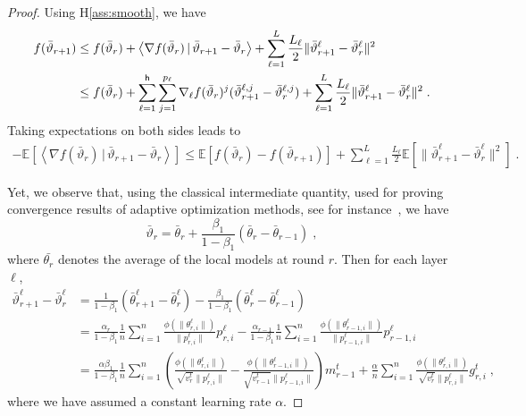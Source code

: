 \documentclass[11pt]{article}
\newcommand{\eqsp}{\;}
\newcommand{\beq}{\begin{equation}}
\newcommand{\eeq}{\end{equation}}
\def\EE{\mathbb{E}}
\newcommand{\pscal}[2]{\left\langle#1\,|\,#2 \right\rangle}
\def\tot{\mathsf{h}}
\begin{document}
\begin{proof}
Using H\ref{ass:smooth}, we have
\begin{align}\notag
f(\bar{\vartheta}_{r+1}) &  \leq f(\bar{\vartheta}_r) + \pscal{\nabla f(\bar{\vartheta}_r)}{\bar{\vartheta}_{r+1} - \bar{\vartheta}_r} + \sum_{\ell =1}^L \frac{L_\ell}{2} \| \bar{\vartheta}^\ell_{r+1} - \bar{\vartheta}^\ell_r \|^2\\\notag
&  \leq f(\bar{\vartheta}_r) + \sum_{\ell=1}^\tot \sum_{j=1}^{p_\ell} \nabla_{\ell} f(\bar{\vartheta}_r)^j (\bar{\vartheta}^{\ell,j}_{r+1} - \bar{\vartheta}^{\ell,j}_r) + \sum_{\ell =1}^L \frac{L_\ell}{2} \| \bar{\vartheta}^\ell_{r+1} - \bar{\vartheta}^\ell_r \|^2  \eqsp.
\end{align}
Taking expectations on both sides leads to
\begin{align}\label{eq:main}
- \EE[  \pscal{\nabla f(\bar{\vartheta}_r)}{\bar{\vartheta}_{r+1} - \bar{\vartheta}_r}]  \leq  \EE[ f(\bar{\vartheta}_r) - f(\bar{\vartheta}_{r+1})] + \sum_{\ell =1}^L \frac{L_\ell}{2} \EE[  \| \bar{\vartheta}^\ell_{r+1} - \bar{\vartheta}^\ell_r \|^2] \eqsp.
\end{align}

Yet, we observe that, using the classical intermediate quantity, used for proving convergence results of adaptive optimization methods, see for instance~\citet{reddi2019convergence}, we have
\beq\label{eq:defseq}
\bar{\vartheta}_r = \bar{\theta}_r +  \frac{\beta_1}{1-\beta_1}(\bar{\theta}_{r} - \bar{\theta}_{r-1}) \eqsp,
\eeq
where $\bar{\theta_r}$ denotes the average of the local models at round $r$.
Then for each layer $\ell$,
\begin{align}\label{eq:gap}
\bar{\vartheta}^\ell_{r+1} - \bar{\vartheta}^\ell_r  & = \frac{1}{1-\beta_1}(\bar{\theta}^\ell_{r+1} - \bar{\theta}^\ell_{r}) - \frac{\beta_1}{1-\beta_1}(\bar{\theta}^\ell_{r} - \bar{\theta}^\ell_{r-1}) \nonumber\\
& = \frac{\alpha_{r}}{1-\beta_1} \frac{1}{n} \sum_{i = 1}^n \frac{\phi(\|\theta_{r,i}^{\ell}\|)}{\|p_{r,i}^{\ell}\|} p_{r,i}^{\ell}  - \frac{\alpha_{r-1}}{1-\beta_1} \frac{1}{n} \sum_{i = 1}^n \frac{\phi(\|\theta_{r-1,i}^{\ell}\|)}{\|p_{r-1,i}^{\ell}\|} p_{r-1,i}^{\ell}\nonumber\\
& = \frac{\alpha \beta_1}{1-\beta_1} \frac{1}{n}  \sum_{i = 1}^n  \left( \frac{\phi(\|\theta_{r,i}^{\ell}\|)}{\sqrt{v^{t}_{r}} \|p_{r,i}^{\ell}\|} - \frac{\phi(\|\theta_{r-1,i}^{\ell}\|)}{\sqrt{v^{t}_{r-1}} \|p_{r-1,i}^{\ell}\|} \right) m^{t}_{r-1} + \frac{\alpha}{n} \sum_{i = 1}^n \frac{\phi(\|\theta_{r,i}^{\ell}\|)}{\sqrt{v^{t}_{r}} \|p_{r,i}^{\ell}\|} g^t_{r,i} \eqsp,
\end{align}
where we have assumed a constant learning rate $\alpha$.



\end{proof}
\end{document}

